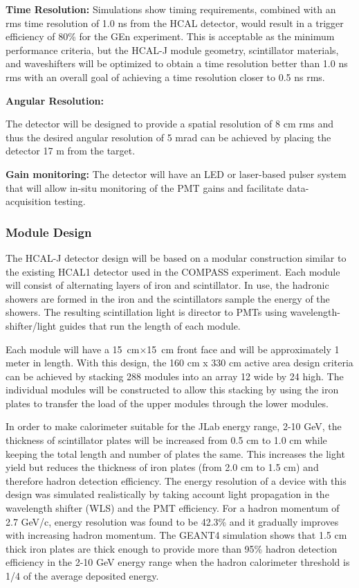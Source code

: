 \documentclass[11pt]{article}
\begin{document}
{\bf Time Resolution:}
Simulations show timing requirements, combined with an rms time resolution of 1.0 ns from the HCAL
detector, would result in a trigger efficiency of 80\% for the GEn experiment.   This is acceptable
as the minimum performance criteria, but the HCAL-J module geometry, scintillator materials, and 
waveshifters will be optimized to obtain a time resolution better than 1.0 ns rms with an overall 
goal of achieving a time resolution closer to 0.5 ns rms.

{\bf Angular Resolution:}{
The detector will be designed to provide a spatial resolution of 8 cm rms and thus the desired 
angular resolution of 5 mrad can be achieved by placing the detector 17 m from the target.

{\bf Gain monitoring:}
The detector will have an LED or laser-based pulser system that will allow in-situ monitoring of 
the PMT gains and facilitate data-acquisition testing.

\subsubsection{Module Design}
\label{sec:Module}
The HCAL-J detector design will be based on a modular construction similar to the existing HCAL1 detector used in the COMPASS experiment.  Each module will consist of alternating layers of iron and scintillator.   In use, the hadronic showers are formed in the iron and the scintillators sample the energy of the showers.  The resulting scintillation light is director to PMTs using wavelength-shifter/light guides that run the length of each module.

Each module will have a 15~cm$ \times $15~cm front face  and will be approximately 1 meter in length.  With this design, the 160 cm x 330 cm active area design criteria can be achieved by stacking 288 modules into an array 12 wide by 24 high.  The individual modules will be constructed to allow this stacking by using the iron plates to transfer the load of the upper modules through the lower modules.

In order to make calorimeter suitable for the JLab energy range, 2-10 GeV, 
the thickness of scintillator plates will be  increased from 0.5 cm to 1.0 cm 
while keeping the total length and number of plates the same. This increases the light yield but 
reduces the thickness of iron plates (from 2.0 cm to 1.5 cm) and therefore hadron detection efficiency. 
The energy resolution of a device with this design was simulated realistically by taking account light propagation in the wavelength shifter (WLS)
and the PMT efficiency. For a hadron momentum of 2.7 GeV/c,  energy resolution was found to be 42.3\% and it gradually improves with 
increasing hadron momentum.
The GEANT4 simulation shows that 1.5 cm thick iron plates are thick enough to provide more 
than 95\% hadron detection efficiency in the 2-10 GeV energy range when the hadron calorimeter 
threshold is 1/4 of the average  deposited energy.  

}
\end{document}
